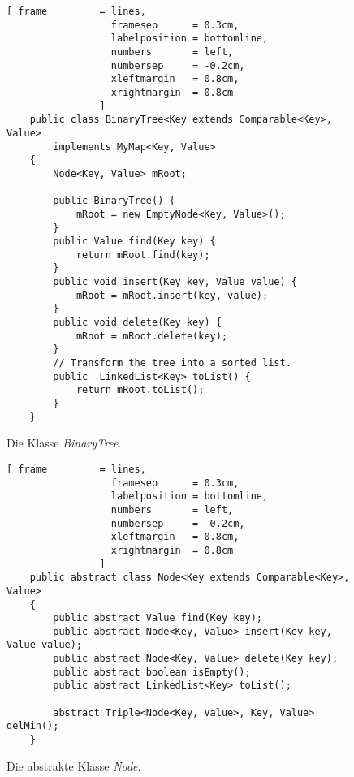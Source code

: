 \begin{figure}[!ht]
  \centering
\begin{Verbatim}[ frame         = lines, 
                  framesep      = 0.3cm, 
                  labelposition = bottomline,
                  numbers       = left,
                  numbersep     = -0.2cm,
                  xleftmargin   = 0.8cm,
                  xrightmargin  = 0.8cm
                ]
    public class BinaryTree<Key extends Comparable<Key>, Value> 
        implements MyMap<Key, Value>
    {
        Node<Key, Value> mRoot;  
    
        public BinaryTree() {
            mRoot = new EmptyNode<Key, Value>();
        }
        public Value find(Key key) {
            return mRoot.find(key);
        }    
        public void insert(Key key, Value value) {
            mRoot = mRoot.insert(key, value);
        }
        public void delete(Key key) {
            mRoot = mRoot.delete(key);
        }
        // Transform the tree into a sorted list.
        public  LinkedList<Key> toList() {
            return mRoot.toList();
        }
    }
\end{Verbatim}
\vspace*{-0.3cm}
  \caption{Die Klasse \textsl{BinaryTree}.}
  \label{fig:BinTree.java}
\end{figure}



\begin{figure}[!ht]
  \centering
\begin{Verbatim}[ frame         = lines, 
                  framesep      = 0.3cm, 
                  labelposition = bottomline,
                  numbers       = left,
                  numbersep     = -0.2cm,
                  xleftmargin   = 0.8cm,
                  xrightmargin  = 0.8cm
                ]
    public abstract class Node<Key extends Comparable<Key>, Value>
    {
        public abstract Value find(Key key);
        public abstract Node<Key, Value> insert(Key key, Value value);
        public abstract Node<Key, Value> delete(Key key);
        public abstract boolean isEmpty();
        public abstract LinkedList<Key> toList();
    
        abstract Triple<Node<Key, Value>, Key, Value> delMin();
    }
\end{Verbatim}
\vspace*{-0.3cm}
  \caption{Die abstrakte Klasse \textsl{Node}.}
  \label{fig:Node.java}
\end{figure}

